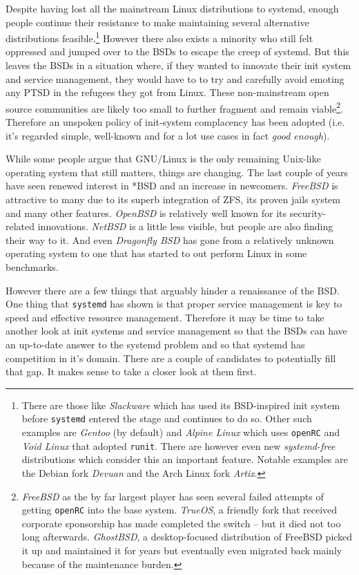 \documentclass{article}
\begin{document}
Despite having lost all the mainstream Linux distributions to systemd, enough people continue their
resistance to make maintaining several alternative distributions feasible.\footnote{There are those
like \textit{Slackware} which has used its BSD-inspired init system before \texttt{systemd} entered the
stage and continues to do so. Other such examples are \textit{Gentoo} (by default) and \textit{Alpine
Linux} which uses \texttt{openRC} and \textit{Void Linux} that adopted \texttt{runit}. There are
however even new \textit{systemd-free} distributions which consider this an important feature. Notable
examples are the Debian fork \textit{Devuan} and the Arch Linux fork \textit{Artix}.} However there
also exists a minority who still felt oppressed and jumped over to the BSDs to escape the creep of
systemd. But this leaves the BSDs in a situation where, if they wanted to innovate their init system
and service management, they would have to to try and carefully avoid emoting any PTSD in the refugees
they got from Linux. These non-mainstream open source communities are likely too small to further
fragment and remain viable\footnote{\textit{FreeBSD} as the by far largest player has seen several
failed attempts of getting \texttt{openRC} into the base system. \textit{TrueOS}, a friendly fork that
received corporate sponsorship has made completed the switch -- but it died not too long afterwards.
\textit{GhostBSD}, a desktop-focused distribution of FreeBSD picked it up and maintained it for years
but eventually even migrated back mainly because of the maintenance burden.}. Therefore an unspoken
policy of init-system complacency has been adopted (i.e. it's regarded simple, well-known and for a lot
use cases in fact \textit{good enough}).

While some people argue that GNU/Linux is the only remaining Unix-like operating system that still
matters, things are changing. The last couple of years have seen renewed interest in *BSD and an
increase in newcomers. \textit{FreeBSD} is attractive to many due to its superb integration of ZFS, its
proven jails system and many other features. \textit{OpenBSD} is relatively well known for its
security-related innovations. \textit{NetBSD} is a little less visible, but people are also finding
their way to it. And even \textit{Dragonfly BSD} has gone from a relatively unknown operating system to
one that has started to out perform Linux in some benchmarks.

However there are a few things that arguably hinder a renaissance of the BSD. One thing that
\texttt{systemd} has shown is that proper service management is key to speed and effective resource
management. Therefore it may be time to take another look at init systems and service management so
that the BSDs can have an up-to-date answer to the systemd problem and so that systemd has competition
in it's domain. There are a couple of candidates to potentially fill that gap. It makes sense to take a
closer look at them first.
\end{document}
